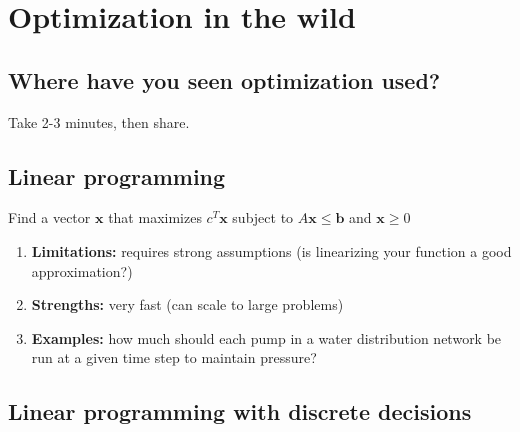 \documentclass[
  letterpaper,
  DIV=11,
  numbers=noendperiod]{scrreprt}
\providecommand{\tightlist}{%
  \setlength{\itemsep}{0pt}\setlength{\parskip}{0pt}}
\begin{document}
\section{Optimization in the wild}\label{optimization-in-the-wild}

\subsection{Where have you seen optimization
used?}\label{where-have-you-seen-optimization-used}

\begin{tcolorbox}[enhanced jigsaw, arc=.35mm, breakable, title=\textcolor{quarto-callout-tip-color}{\faLightbulb}\hspace{0.5em}{Reflect}, coltitle=black, opacityback=0, bottomtitle=1mm, colback=white, left=2mm, opacitybacktitle=0.6, toptitle=1mm, colframe=quarto-callout-tip-color-frame, leftrule=.75mm, titlerule=0mm, rightrule=.15mm, bottomrule=.15mm, colbacktitle=quarto-callout-tip-color!10!white, toprule=.15mm]

Take 2-3 minutes, then share.

\end{tcolorbox}

\subsection{Linear programming}\label{linear-programming}

Find a vector \(\mathbf{x}\) that maximizes \(c^T \mathbf{x}\) subject
to \(A \mathbf{x} \leq \mathbf{b}\) and \(\mathbf{x} \geq 0\)

\begin{enumerate}
\def\labelenumi{\arabic{enumi}.}
\tightlist
\item
  \textbf{Limitations:} requires strong assumptions (is linearizing your
  function a good approximation?)
\item
  \textbf{Strengths:} very fast (can scale to large problems)
\item
  \textbf{Examples:} how much should each pump in a water distribution
  network be run at a given time step to maintain pressure?
\end{enumerate}

\subsection{Linear programming with discrete
decisions}\label{linear-programming-with-discrete-decisions}
\end{document}
